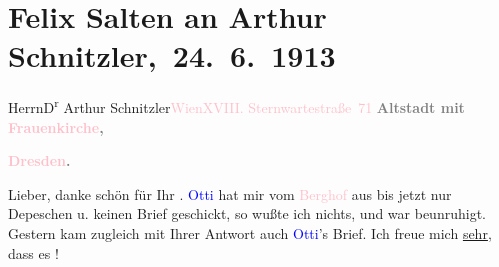 

\renewcommand{\erwaehntePersonen}{Personen: Lili Cappellini, Felix Salten, Ottilie Salten, Heinrich Schnitzler, Olga Schnitzler}
\renewcommand{\erwaehnteOrte}{Orte: Berghof, Dresden, Frauenkirche, Sternwartestraße 71, Wien}
\renewcommand{\erwaehnteWerke}{}
\section[ Felix Salten an Arthur Schnitzler, 24. 6. 1913]{Felix Salten an Arthur Schnitzler, 24. 6. 1913}
\nopagebreak{}
\rehead{ }\normalsize\beginnumbering{}
\toendnotes[C]{\smallbreak\pagebreak[2]}
\toendnotes[C]{\smallbreak}\pstart{}{\pb}Herrn\pend{}\pstart{}D\textsuperscript{r} Arthur Schnitzler\pend{}\pstart{}\textcolor{pink}{Wien}{}\ledrightnote{\textcolor{pink}{Wien}}\pend{}\pstart{}\textcolor{pink}{XVIII. Sternwartestraße 71}{}\ledrightnote{\textcolor{pink}{Sternwartestraße 71}}\pend{}
{\bigskip}
\pstart
           \noindent{}\centering{}{\pb}\textcolor{gray}{\textbf{Altstadt mit \textcolor{pink}{Frauenkirche}{}\ledrightnote{\textcolor{pink}{Frauenkirche}}\textcolor{gray}{,}}}\pend
           
\pstart
           \noindent{}\centering{}\textcolor{gray}{\textbf{\textcolor{pink}{Dresden}{}\ledrightnote{\textcolor{pink}{Dresden}}.}}\pend
           
\pstart{}{\pb}Lieber,\pend
\pstart
           danke schön für Ihr \label{K_L03561-1v}\label{K_L03561-1h}. \textcolor{blue}{Otti}{}\ledrightnote{\textcolor{blue}{Ottilie Salten}} hat mir vom \textcolor{pink}{Berghof}{}\ledrightnote{\textcolor{pink}{Berghof}}
               aus bis jetzt nur Depeschen u. keinen Brief geschickt, so wußte ich nichts, und war
               beunruhigt. Gestern kam zugleich mit Ihrer Antwort
               auch \textcolor{blue}{Otti}{}\ledrightnote{\textcolor{blue}{Ottilie Salten}}’s Brief. Ich freue mich \uline{sehr}, dass es \label{K_L03561-2v}\label{K_L03561-2h}!\pend
           
